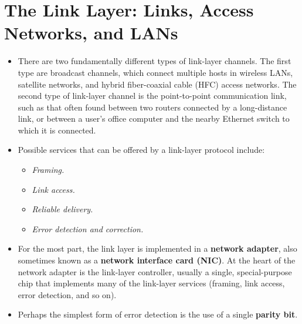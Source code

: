 \section{The Link Layer: Links, Access Networks, and LANs}
\begin{itemize}

\item
There are two fundamentally different types of link-layer channels. The first type are broadcast channels, which connect multiple hosts in wireless LANs, satellite networks, and hybrid fiber-coaxial cable (HFC) access networks. The second type of link-layer channel is the point-to-point communication link, such as that often found between two routers connected by a long-distance link, or between a user's office computer and the nearby Ethernet switch to which it is connected.

\item
Possible services that can be offered by a link-layer protocol include:
\begin{itemize}
\item\textit{Framing.}
\item\textit{Link access.}
\item\textit{Reliable delivery.}
\item\textit{Error detection and correction.}
\end{itemize}

\item
For the most part, the link layer is implemented in a \textbf{network adapter}, also sometimes known as a \textbf{network interface card (NIC)}. At the heart of the network adapter is the link-layer controller, usually a single, special-purpose chip that implements many of the link-layer services (framing, link access, error detection, and so on).

\item
Perhaps the simplest form of error detection is the use of a single \textbf{parity bit}.

\end{itemize}